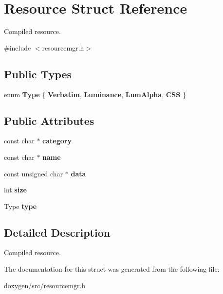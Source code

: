\hypertarget{struct_resource}{}\section{Resource Struct Reference}
\label{struct_resource}


Compiled resource.  




{\ttfamily \#include $<$resourcemgr.\+h$>$}

\subsection*{Public Types}
\begin{DoxyCompactItemize}
\item 
\mbox{\label{struct_resource_abde5e686869a8c7241557d18033b382e}} 
enum {\bfseries Type} \{ {\bfseries Verbatim}, 
{\bfseries Luminance}, 
{\bfseries Lum\+Alpha}, 
{\bfseries C\+SS}
 \}
\end{DoxyCompactItemize}
\subsection*{Public Attributes}
\begin{DoxyCompactItemize}
\item 
\mbox{\label{struct_resource_a8bbbf27d6106005f06d12e1489457188}} 
const char $\ast$ {\bfseries category}
\item 
\mbox{\label{struct_resource_a0695b8faedc32497170802bea7cf8ac7}} 
const char $\ast$ {\bfseries name}
\item 
\mbox{\label{struct_resource_ac5775d3448fb9ed16c0ec90dbed87a71}} 
const unsigned char $\ast$ {\bfseries data}
\item 
\mbox{\label{struct_resource_a0f8739be95e0d934239663ea7551060b}} 
int {\bfseries size}
\item 
\mbox{\label{struct_resource_ae73282ad08d3c990c8a0ff353e231ab3}} 
Type {\bfseries type}
\end{DoxyCompactItemize}


\subsection{Detailed Description}
Compiled resource. 

The documentation for this struct was generated from the following file\+:\begin{DoxyCompactItemize}
\item 
doxygen/src/resourcemgr.\+h\end{DoxyCompactItemize}

